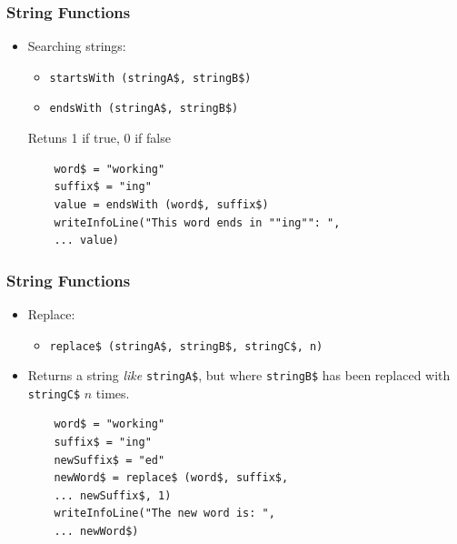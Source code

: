 \documentclass[handout]{beamer}
\begin{document}
\begin{frame}[fragile]
\frametitle{String Functions}
\begin{itemize}
    \item <1-> Searching strings:
    \begin{itemize}
        \item \texttt{startsWith (stringA\$, stringB\$)}
        \item \texttt{endsWith (stringA\$, stringB\$)}
    \end{itemize}
    Retuns 1 if true, 0 if false

    \begin{verbatim}
    word$ = "working"
    suffix$ = "ing"
    value = endsWith (word$, suffix$)
    writeInfoLine("This word ends in ""ing"": ",
    ... value)
    \end{verbatim}

\end{itemize}
\end{frame}

\begin{frame}[fragile]
\frametitle{String Functions}
\begin{itemize}
    \item <1-> Replace:
    \begin{itemize}
        \item \texttt{replace\$ (stringA\$, stringB\$, stringC\$, n)}
    \end{itemize}
    \item <1-> Returns a string \emph{like} \texttt{stringA\$}, but where \texttt{stringB\$} has been replaced with \texttt{stringC\$} $n$ times.

    \begin{verbatim}
    word$ = "working"
    suffix$ = "ing"
    newSuffix$ = "ed"
    newWord$ = replace$ (word$, suffix$,
    ... newSuffix$, 1)
    writeInfoLine("The new word is: ",
    ... newWord$)
    \end{verbatim}

\end{itemize}
\end{frame}
\end{document}
